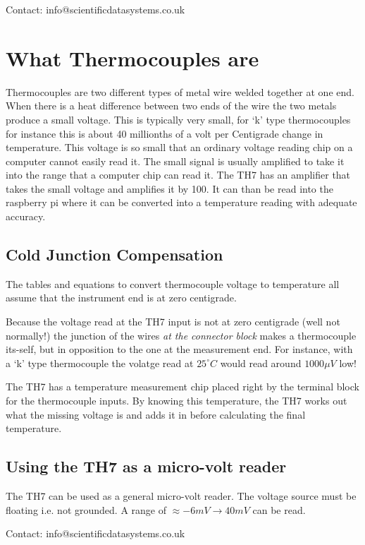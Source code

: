 \documentclass[10pt,foldmark]{leaflet}
\begin{document}
Contact: info@scientificdatasystems.co.uk


\section{What Thermocouples are}

Thermocouples are two different types of metal wire welded together
at one end.
When there is a heat difference between two ends of the wire
the two metals produce a small voltage.
This is typically very small, for `k' type thermocouples for instance
this is about 40 millionths of a volt per Centigrade change in temperature.
This voltage is so small that an ordinary voltage reading chip on
a computer cannot easily read it. The small signal is usually amplified
to take it into the range that a computer chip can read it.
The TH7 has an amplifier that takes the small voltage and amplifies it by 100.
It can than be read into the raspberry pi where it can be converted into
a temperature reading with adequate accuracy.

\subsection{Cold Junction Compensation}

The tables and equations to convert thermocouple voltage to
temperature all assume that the instrument end is at zero centigrade.

Because the voltage read at the TH7 input is not at zero centigrade (well not normally!)
the junction of the wires {\em at the connector block}  makes a thermocouple its-self, but in opposition to
the one at the measurement end. For instance, with a `k' type thermocouple
the volatge read at $25^\circ C$ would read around $1000 \mu V$ low!

The TH7 has a temperature measurement chip placed right by the terminal block for the thermocouple inputs.
By knowing this temperature, the TH7 works out what the missing voltage is
and adds it in before calculating the final temperature.

\subsection{Using the TH7 as a micro-volt reader}

The TH7 can be used as a general micro-volt reader.
The voltage source must be floating i.e. not grounded.
A range of $\approx -6mV \rightarrow 40mV$ can be read.

\mbox{}
\vfill

Contact: info@scientificdatasystems.co.uk
\end{document}
